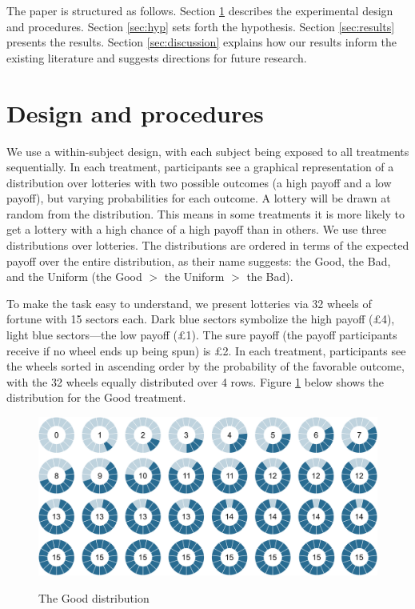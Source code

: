 The paper is structured as follows.
Section \ref{sec:proced} describes the experimental design and procedures.
Section \ref{sec:hyp} sets forth the hypothesis.
Section \ref{sec:results} presents the results.
Section \ref{sec:discussion} explains how our results inform the existing literature and suggests directions for future research.


\section{Design and procedures}\label{sec:proced}
We use a within-subject design, with each subject being exposed to all treatments sequentially.
In each treatment, participants see a graphical representation of a distribution over lotteries with two possible outcomes (a high payoff and a low payoff), but varying probabilities for each outcome.
A lottery will be drawn at random from the distribution.
This means in some treatments it is more likely to get a lottery with a high chance of a high payoff than in others.
We use three distributions over lotteries.
The distributions are ordered in terms of the expected payoff over the entire distribution, as their name suggests: the Good, the Bad, and the Uniform (the Good $>$ the Uniform $>$ the Bad).

To make the task easy to understand, we present lotteries via 32 wheels of fortune with 15 sectors each.
Dark blue sectors symbolize the high payoff (\pounds4), light blue sectors---the low payoff (\pounds1).
The sure payoff (the payoff participants receive if no wheel ends up being spun) is \pounds2.
In each treatment, participants see the wheels sorted in ascending order by the probability of the favorable outcome, with the 32 wheels equally distributed over 4 rows.
Figure \ref{fig:TheGood} below shows the distribution for the Good treatment.

\begin{figure}[h!]
  \centering
 {\includegraphics[width=\linewidth]{Left_15.pdf}}
  \caption{The Good distribution}
  \label{fig:TheGood}
\end{figure}

